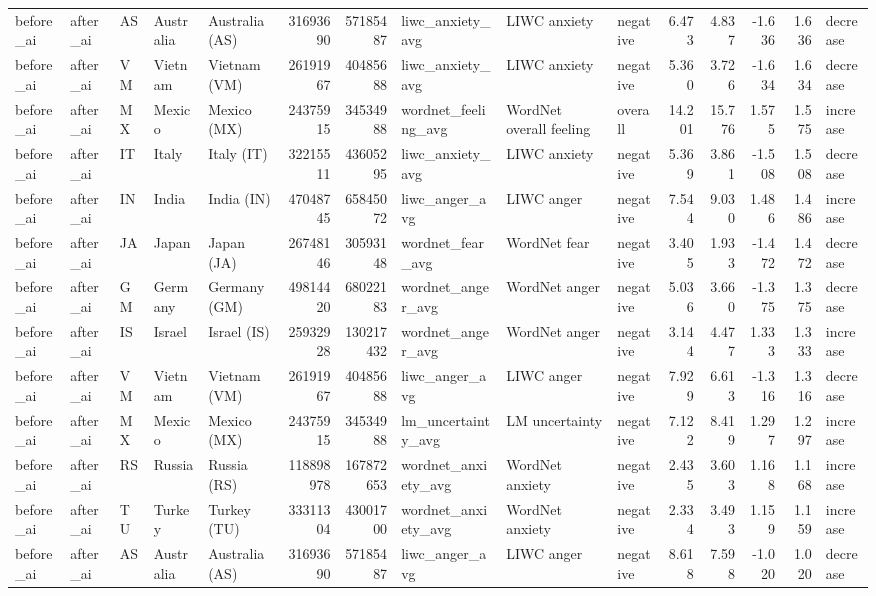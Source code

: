 \begin{tabular}{lllllrrlllrrrrl}
before\_ai & after\_ai & AS & Australia & Australia (AS) & 31693690 & 57185487 & liwc\_anxiety\_avg & LIWC anxiety & negative & 6.473 & 4.837 & -1.636 & 1.636 & decrease \\
before\_ai & after\_ai & VM & Vietnam & Vietnam (VM) & 26191967 & 40485688 & liwc\_anxiety\_avg & LIWC anxiety & negative & 5.360 & 3.726 & -1.634 & 1.634 & decrease \\
before\_ai & after\_ai & MX & Mexico & Mexico (MX) & 24375915 & 34534988 & wordnet\_feeling\_avg & WordNet overall feeling & overall & 14.201 & 15.776 & 1.575 & 1.575 & increase \\
before\_ai & after\_ai & IT & Italy & Italy (IT) & 32215511 & 43605295 & liwc\_anxiety\_avg & LIWC anxiety & negative & 5.369 & 3.861 & -1.508 & 1.508 & decrease \\
before\_ai & after\_ai & IN & India & India (IN) & 47048745 & 65845072 & liwc\_anger\_avg & LIWC anger & negative & 7.544 & 9.030 & 1.486 & 1.486 & increase \\
before\_ai & after\_ai & JA & Japan & Japan (JA) & 26748146 & 30593148 & wordnet\_fear\_avg & WordNet fear & negative & 3.405 & 1.933 & -1.472 & 1.472 & decrease \\
before\_ai & after\_ai & GM & Germany & Germany (GM) & 49814420 & 68022183 & wordnet\_anger\_avg & WordNet anger & negative & 5.036 & 3.660 & -1.375 & 1.375 & decrease \\
before\_ai & after\_ai & IS & Israel & Israel (IS) & 25932928 & 130217432 & wordnet\_anger\_avg & WordNet anger & negative & 3.144 & 4.477 & 1.333 & 1.333 & increase \\
before\_ai & after\_ai & VM & Vietnam & Vietnam (VM) & 26191967 & 40485688 & liwc\_anger\_avg & LIWC anger & negative & 7.929 & 6.613 & -1.316 & 1.316 & decrease \\
before\_ai & after\_ai & MX & Mexico & Mexico (MX) & 24375915 & 34534988 & lm\_uncertainty\_avg & LM uncertainty & negative & 7.122 & 8.419 & 1.297 & 1.297 & increase \\
before\_ai & after\_ai & RS & Russia & Russia (RS) & 118898978 & 167872653 & wordnet\_anxiety\_avg & WordNet anxiety & negative & 2.435 & 3.603 & 1.168 & 1.168 & increase \\
before\_ai & after\_ai & TU & Turkey & Turkey (TU) & 33311304 & 43001700 & wordnet\_anxiety\_avg & WordNet anxiety & negative & 2.334 & 3.493 & 1.159 & 1.159 & increase \\
before\_ai & after\_ai & AS & Australia & Australia (AS) & 31693690 & 57185487 & liwc\_anger\_avg & LIWC anger & negative & 8.618 & 7.598 & -1.020 & 1.020 & decrease \\

\end{tabular}
